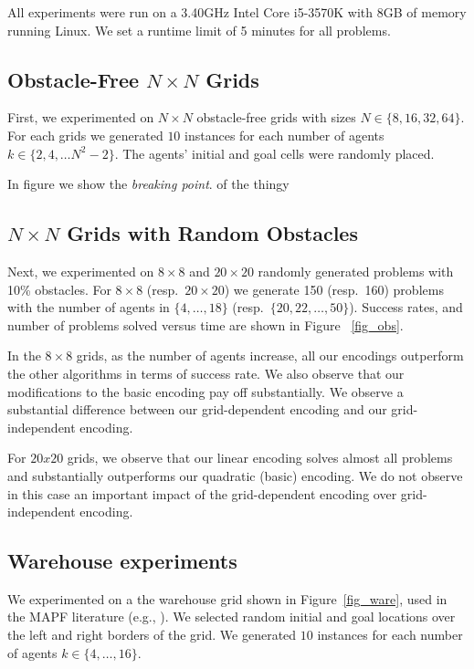All experiments were run on a 3.40GHz Intel Core i5-3570K with 8GB of memory running Linux. We set a runtime limit of 5 minutes for all problems.


\subsection{Obstacle-Free $N\times N$ Grids} First, we experimented on $N\times N$ obstacle-free grids with sizes $N\in\{8,16,32,64\}$. For each grids we generated $10$ instances for each number of agents $k\in \{2,4, \ldots N^2 -2 \}$. The agents' initial and goal cells were randomly placed.


In figure we show the \emph{breaking point}. of the thingy


\subsection{$N\times N$ Grids with Random Obstacles}
Next, we experimented on $8\times 8$ and $20\times 20$ randomly generated problems with 10\% obstacles. For $8\times8$ (resp.~$20\times 20$) we generate 150 (resp.~160) problems with the number of agents in $\{4,\dots,18\}$ (resp.~$\{20,22,\ldots,50\}$). Success rates, and number of problems solved versus time are shown in Figure ~\ref{fig_obs}.

In the $8\times8$ grids, as the number of agents increase, all our encodings outperform the other algorithms in terms of success rate. We also observe that our modifications to the basic encoding pay off substantially. We observe a substantial difference between our grid-dependent encoding and our grid-independent encoding.

For $20x20$ grids, we observe that our linear encoding solves almost all problems and substantially outperforms our quadratic (basic) encoding. We do not observe in this case an important impact of the grid-dependent encoding over grid-independent encoding.


\subsection{Warehouse experiments}
We experimented on a the warehouse grid shown in Figure~\ref{fig_ware}, used in the MAPF literature (e.g., ). We selected random initial and goal locations over the left and right borders of the grid. We generated $10$ instances for each number of agents $k\in \{4, \ldots, 16\}$.

